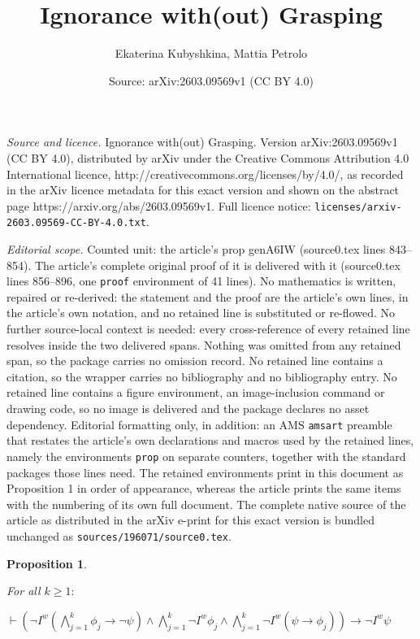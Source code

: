 \documentclass[10pt,a4paper]{amsart}
\title{Ignorance with(out) Grasping}
\author{Ekaterina Kubyshkina, Mattia Petrolo}
\date{Source: arXiv:2603.09569v1 (CC BY 4.0)}
\newtheorem{prop}{Proposition}
\begin{document}
\maketitle

\noindent\emph{Source and licence.} Ignorance with(out) Grasping. Version arXiv:2603.09569v1 (CC BY 4.0), distributed by arXiv under the Creative Commons Attribution 4.0 International licence, http://creativecommons.org/licenses/by/4.0/, as recorded in the arXiv licence metadata for this exact version and shown on the abstract page https://arxiv.org/abs/2603.09569v1. Full licence notice: \texttt{licenses/arxiv-2603.09569-CC-BY-4.0.txt}.\par\smallskip

\noindent\textit{Editorial scope.} Counted unit: the article's prop genA6IW (source0.tex lines 843--854). The article's complete original proof of it is delivered with it (source0.tex lines 856--896, one \texttt{proof} environment of 41 lines). No mathematics is written, repaired or re-derived: the statement and the proof are the article's own lines, in the article's own notation, and no retained line is substituted or re-flowed.  No further source-local context is needed: every cross-reference of every retained line resolves inside the two delivered spans.  Nothing was omitted from any retained span, so the package carries no omission record.  No retained line contains a citation, so the wrapper carries no bibliography and no bibliography entry.  No retained line contains a figure environment, an image-inclusion command or drawing code, so no image is delivered and the package declares no asset dependency.  Editorial formatting only, in addition: an AMS \texttt{amsart} preamble that restates the article's own declarations and macros used by the retained lines, namely the environments \texttt{prop} on separate counters, together with the standard packages those lines need.  The retained environments print in this document as Proposition 1 in order of appearance, whereas the article prints the same items with the numbering of its own full document.  The complete native source of the article as distributed in the arXiv e-print for this exact version is bundled unchanged as \texttt{sources/196071/source0.tex}.
\begin{prop}
\label{genA6IW}

For all $k \geq 1:$

\begin{center}

$\vdash (\neg I^{w} (\bigwedge^{k}_{j=1} \phi_{j} \rightarrow \neg \psi) \wedge \bigwedge^{k}_{j=1} \neg I^{w} \phi_{j} \wedge \bigwedge^{k}_{j=1} \neg I^{w}(\psi \rightarrow \phi_{j})) \rightarrow \neg I^{w} \psi$

\end{center}

\end{prop}
\end{document}
